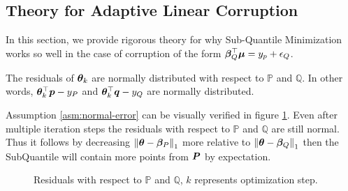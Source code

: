 \documentclass{article} %
\newcommand{\norm}[1]{\left\lVert#1\right\rVert}
\begin{document}
\begin{appendices}
	\section{Theory for Adaptive Linear Corruption}
	In this section, we provide rigorous theory for why Sub-Quantile Minimization works so well in the case of corruption of the form $\displaystyle {\bm{\beta}}_Q^\top {\bm{\mu}} = y_p + {\epsilon}_Q$.
	\begin{assumption}\label{asm:normal-error}
		The residuals of ${\bm{\theta}}_k$ are normally distributed with respect to $\mathbb{P}$ and $\mathbb{Q}$. In other words, ${\bm{\theta}}_k^\top {\bm{p}} - y_P$ and ${\bm{\theta}}_k^\top {\bm{q}} - y_Q$ are normally distributed.
	\end{assumption}
	Assumption \ref{asm:normal-error} can be visually verified in figure \ref{fig:normal-residual}. Even after multiple iteration steps the residuals with respect to $\mathbb{P}$ and $\mathbb{Q}$ are still normal. Thus it follows by decreasing $\norm{\vtheta - \vbeta_P}_1$ more relative to $\norm{\vtheta - \vbeta_Q}_1$ then the SubQuantile will contain more points from ${\bm{P}}$ by expectation. 
	\begin{figure}
		\begin{minipage}[htbp]{0.24\textwidth}
			\centering
			
			\label{fig:1}
		\end{minipage}
		\hfill
		\begin{minipage}[htbp]{0.24\textwidth}
			\centering
			
			\label{fig:2}
		\end{minipage}
		\hfill
		\begin{minipage}[htbp]{0.24\textwidth}
			\centering
			
			\label{fig:3}
		\end{minipage}
		\hfill
		\begin{minipage}[htbp]{0.24\textwidth}
			\centering
			
			\label{fig:4}
		\end{minipage}
		\caption{Residuals with respect to $\mathbb{P}$ and $\mathbb{Q}$, $k$ represents optimization step.}
		\label{fig:normal-residual}
	\end{figure}
	

\end{appendices}
\end{document}
